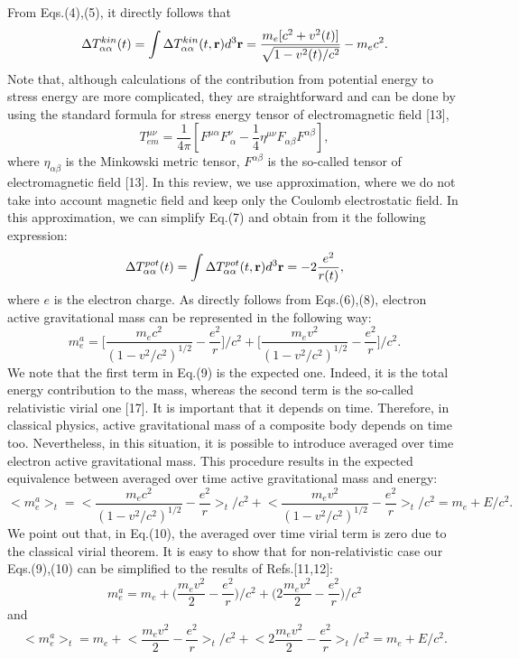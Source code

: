 \documentclass{ws-ijmpd}
\begin{document}
From Eqs.(4),(5), it directly follows that
\begin{equation}
\Delta T^{kin}_{\alpha \alpha}(t) = \int \Delta T^{kin}_{\alpha
\alpha}(t,{\bf r}) d^3{\bf r} = \frac{m_e [c^2
+v^2(t)]}{\sqrt{1-v^2(t)/c^2}} -m_ec^2.
\end{equation}
Note that, although calculations of the contribution from potential
energy to stress energy are more complicated, they are straightforward
and can be done by using the standard formula for stress energy
tensor of electromagnetic field [13],
\begin{equation}
T_{em}^{\mu \nu} = \frac{1}{4 \pi} [F^{\mu \alpha} F^{\nu}_{\
\alpha} - \frac{1}{4} \eta^{\mu \nu} F_{\alpha \beta} F^{\alpha
\beta}],
\end{equation}
where $\eta_{\alpha \beta}$ is the Minkowski metric tensor,
$F^{\alpha \beta}$ is the so-called tensor of electromagnetic
field [13]. In this review, we use approximation, where we do not
take into account magnetic field and keep only the Coulomb
electrostatic field. In this approximation, we can simplify Eq.(7)
and obtain from it the following expression:
\begin{equation}
\Delta T^{pot}_{\alpha \alpha} (t) = \int \Delta T^{pot}_{\alpha
\alpha}(t,{\bf r}) d^3{\bf r} = -2\frac{e^2}{r(t)},
\end{equation}
where $e$ is the electron charge.
As directly follows from Eqs.(6),(8), electron active
gravitational mass can be represented in the following way:
\begin{equation}
m^a_e = \biggl[\frac{m_e c^2}{(1 -v^2/c^2)^{1/2}} - \frac{e^2}{r}
\biggl]/c^2 + \biggl[\frac{m_e v^2}{(1
-v^2/c^2)^{1/2}}-\frac{e^2}{r}\biggl]/c^2.
\end{equation}
We note that the first term in Eq.(9) is the expected one. Indeed,
it is the total energy contribution to the mass, whereas the
second term is the so-called relativistic virial one [17]. It is
important that it depends on time. Therefore, in classical
physics, active gravitational mass of a composite body depends on
time too. Nevertheless, in this situation, it is possible to
introduce averaged over time electron active gravitational mass.
This procedure results in the expected equivalence between
averaged over time active gravitational mass and energy:
\begin{equation}
<m^a_e>_t = \biggl<\frac{m_e c^2}{(1 -v^2/c^2)^{1/2}} -
\frac{e^2}{r} \biggl>_t/c^2 + \biggl<\frac{m_e v^2}{(1
-v^2/c^2)^{1/2}}-\frac{e^2}{r}\biggl>_t/c^2 = m_e + E/c^2 .
\end{equation}
We point out that, in Eq.(10), the averaged over time virial term
is zero due to the classical virial theorem. It is easy to show
that for non-relativistic case our Eqs.(9),(10) can be simplified
to the results of Refs.[11,12]:
\begin{equation}
m^a_e = m_e + \biggl(\frac{m_e v^2}{2} - \frac{e^2}{r} \biggl)/c^2
+ \biggl(2 \frac{m_e v^2}{2}-\frac{e^2}{r}\biggl)/c^2
\end{equation}
and
\begin{equation}
<m^a_e>_t = m_e + \biggl<\frac{m_e v^2}{2} - \frac{e^2}{r}
\biggl>_t/c^2 + \biggl<2 \frac{m_e
v^2}{2}-\frac{e^2}{r}\biggl>_t/c^2 = m_e + E/c^2.
\end{equation}
\end{document}
